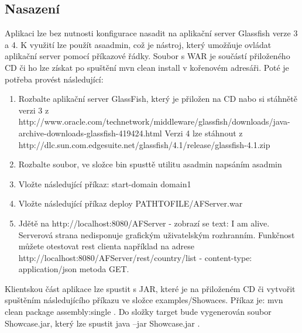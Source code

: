 \subsection{Nasazení}
Aplikaci lze bez nutnosti konfigurace nasadit na aplikační server Glassfish verze 3 a 4. K využití lze použít asaadmin, což je nástroj, který umožňuje ovládat aplikační server pomocí příkazové řádky. Soubor s WAR je součástí přiloženého CD či ho lze získat po spuštění mvn clean install v kořenovém adresáři. Poté je potřeba provést následující:
\begin{enumerate}
\item Rozbalte aplikační server GlassFish, který je přiložen na CD nabo si stáhnětě verzi 3 z http://www.oracle.com/technetwork/middleware/glassfish/downloads/java-archive-downloads-glassfish-419424.html Verzi 4 lze stáhnout z http://dlc.sun.com.edgesuite.net/glassfish/4.1/release/glassfish-4.1.zip
\item Rozbalte soubor, ve složce bin spusttě utilitu asadmin napsáním asadmin
\item Vložte následující příkaz: start-domain domain1
\item Vložte následující příkaz deploy PATHTOFILE/AFServer.war
\item Jdětě na http://localhost:8080/AFServer - zobrazí se text: I am alive. Serverová strana nedisponuje grafickým uživatelským rozhranním. Funkčnost můžete otestovat rest clienta například na adrese http://localhost:8080/AFServer/rest/country/list - content-type: application/json metoda GET.
\end{enumerate}
Klientskou část aplikace lze spustit s JAR, které je na přiloženém CD či vytvořit spuštěním následujícího příkazu ve složce examples/Showaces. Příkaz je: mvn clean package assembly:single . Do složky target bude vygenerován soubor Showcase.jar, který lze spustit java –jar Showcase.jar . 

